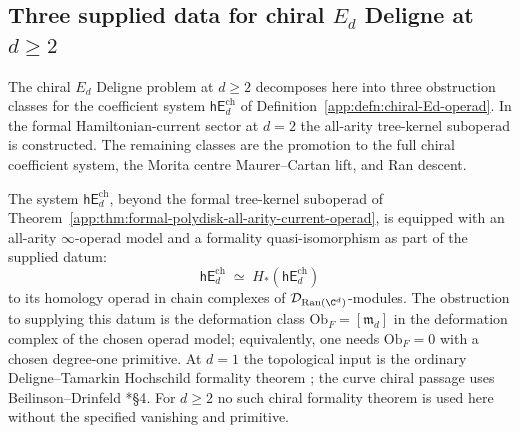 \subsection{Three supplied data for chiral
\texorpdfstring{$E_d$}{Ed} Deligne at \texorpdfstring{$d\geq 2$}{d>=2}}\label{app:hfc:three-hypotheses}

The chiral \(E_d\) Deligne problem at \(d\geq2\) decomposes here into
three obstruction classes for the coefficient system
\(\mathsf{hE}_d^{\mathrm{ch}}\) of
Definition~\ref{app:defn:chiral-Ed-operad}.  In the formal
Hamiltonian-current sector at \(d=2\) the all-arity tree-kernel
suboperad is constructed.  The remaining classes are the promotion to
the full chiral coefficient system, the Morita centre
Maurer--Cartan lift, and Ran descent.

\begin{defn}\label{app:hyp:formality}
The system \(\mathsf{hE}_d^{\mathrm{ch}}\), beyond the formal
tree-kernel suboperad of
Theorem~\ref{app:thm:formal-polydisk-all-arity-current-operad}, is
equipped with an all-arity \(\infty\)-operad model and a formality
quasi-isomorphism as part of the supplied datum:
\[
  \mathsf{hE}_d^{\mathrm{ch}}\;\simeq\;H_*(\mathsf{hE}_d^{\mathrm{ch}})
\]
to its homology operad in chain complexes of
\(\mathcal D_{\mathrm{Ran}(\C^d)}\)-modules.  The obstruction to
supplying this datum is the deformation class
\(\mathrm{Ob}_F=[\mathfrak m_d]\) in the deformation complex of the
chosen operad model; equivalently, one needs \(\mathrm{Ob}_F=0\) with a
chosen degree-one primitive.  At \(d=1\) the topological input is the
ordinary Deligne--Tamarkin Hochschild formality theorem
\cite{tamarkin-deligne}\cite{kontsevich-soibelman-deformation};
the curve chiral passage uses Beilinson--Drinfeld
\cite{beilinson-drinfeld-chiral}*{\S 4}.  For \(d\geq2\) no such
chiral formality theorem is used here without the specified vanishing
and primitive.
\end{defn}

